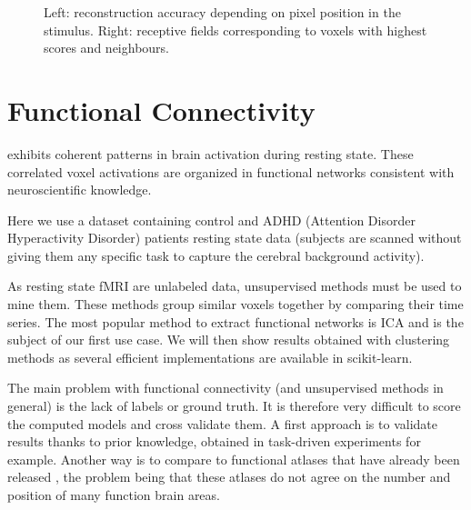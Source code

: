 \documentclass{frontiersSCNS} %
\newcounter{x}
\newcounter{y}
\newcounter{z}
\begin{document}
\begin{figure}[hbtp]
\begin{center}
\begin{tikzpicture}
    \end{tikzpicture}
  \end{center}
  \caption{Left: reconstruction accuracy depending on pixel
           position in the stimulus. Right: receptive fields corresponding to
       voxels with highest scores and neighbours.}
  \label{fig:encoding}
\end{figure}

\section{Functional Connectivity}

\cite{biswal1995} exhibits coherent patterns in
brain activation during resting state. These correlated voxel activations are
organized in functional networks consistent with neuroscientific knowledge.


Here we use a dataset containing control and ADHD
(Attention Disorder Hyperactivity Disorder) patients
resting state data (subjects are scanned without giving them any specific task
to capture the cerebral background activity).

As resting state fMRI are unlabeled data, unsupervised methods must be used to
mine them. These methods group similar voxels together by comparing their time
series.
The most popular method to extract functional networks is ICA and
is the subject of our first use case. We will then show results obtained with
clustering methods as several efficient implementations are available in
scikit-learn.

The main problem with functional connectivity (and unsupervised methods in
general) is the lack of labels or ground truth. It is therefore very difficult
to score the computed models and cross validate them. A first approach is to
validate results thanks to prior knowledge, obtained in task-driven experiments
for example. Another way is to compare to functional atlases that have already
been released \citep{craddock2011,yeo2011}, the problem being that these atlases
do not agree on the number
and position of many function brain areas.
\end{document}
